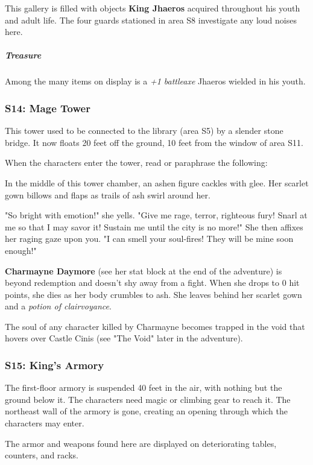 \documentclass[10pt,a4paper,twoside,bg=print,twocolumn,openany,nodeprecatedcode]{dndbook}
\begin{document}
This gallery is filled with objects \textbf{King Jhaeros} acquired throughout his youth and adult life. The four guards stationed in area S8 investigate any loud noises here.

\subparagraph{Treasure}
Among the many items on display is a \textit{+1 battleaxe} Jhaeros wielded in his youth.

\subsubsection{S14: Mage Tower}
This tower used to be connected to the library (area S5) by a slender stone bridge. It now floats 20 feet off the ground, 10 feet from the window of area S11.

When the characters enter the tower, read or paraphrase the following:

\begin{DndReadAloud}{}
In the middle of this tower chamber, an ashen figure cackles with glee. Her scarlet gown billows and flaps as trails of ash swirl around her.

"So bright with emotion!" she yells. "Give me rage, terror, righteous fury! Snarl at me so that I may savor it! Sustain me until the city is no more!" She then affixes her raging gaze upon you. "I can smell your soul-fires! They will be mine soon enough!"

\end{DndReadAloud}

\textbf{Charmayne Daymore} (see her stat block at the end of the adventure) is beyond redemption and doesn't shy away from a fight. When she drops to 0 hit points, she dies as her body crumbles to ash. She leaves behind her scarlet gown and a \textit{potion of clairvoyance}.

The soul of any character killed by Charmayne becomes trapped in the void that hovers over Castle Cinis (see "The Void" later in the adventure).

\subsubsection{S15: King's Armory}
The first-floor armory is suspended 40 feet in the air, with nothing but the ground below it. The characters need magic or climbing gear to reach it. The northeast wall of the armory is gone, creating an opening through which the characters may enter.

\begin{DndReadAloud}{}
The armor and weapons found here are displayed on deteriorating tables, counters, and racks.

\end{DndReadAloud}
\end{document}
